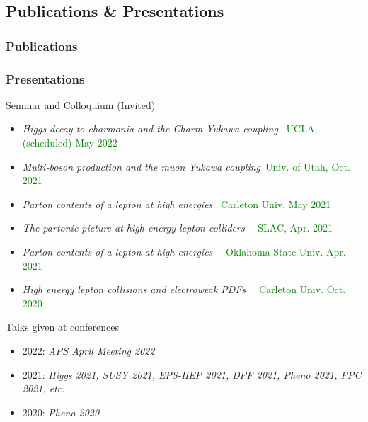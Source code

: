 \documentclass[aspectratio=169]{beamer}
\begin{document}
\subsection{Publications \& Presentations}
\begin{frame}
	\frametitle{Publications}
	{\tiny
	\nocite{*}                   %
	}
\end{frame}
\begin{frame}
	\frametitle{Presentations}
	\begin{exampleblock}{Seminar and Colloquium (Invited)}
		\begin{itemize}
			\item {\it Higgs decay to charmonia and the Charm Yukawa coupling}
			\hspace{8mm}~\textcolor{green}{\small UCLA, (scheduled) May 2022}
			\item {\it Multi-boson production and the muon Yukawa coupling}\hspace{13mm}~\textcolor{green}{\small Univ. of Utah, Oct. 2021}
			\item {\it Parton contents of a lepton at high energies}
			\hspace{30mm}~\textcolor{green}{\small Carleton Univ. May 2021}
			\item {\it The partonic picture at high-energy lepton colliders}
			\hspace{19mm}~~\textcolor{green}{\small SLAC, Apr. 2021}
			\item {\it Parton contents of a lepton at high energies}
			\hspace{30mm}~~\textcolor{green}{\small Oklahoma State Univ. Apr. 2021}
			\item {\it High energy lepton collisions and electroweak PDFs}
			\hspace{19mm}~~\textcolor{green}{\small Carleton Univ. Oct. 2020}
		\end{itemize}
	\end{exampleblock}
	\begin{block}{Talks given at conferences}
		\begin{itemize}
			\item 2022: {\it APS April Meeting 2022}
			\item 2021: {\it Higgs 2021, SUSY 2021, EPS-HEP 2021, DPF 2021, Pheno 2021, PPC 2021, etc.}
			\item 2020: {\it Pheno 2020}
		\end{itemize}
	\end{block}
\end{frame}
\end{document}
